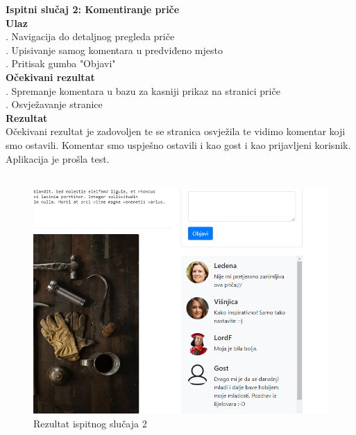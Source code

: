 {			\noindent \textbf{Ispitni slučaj 2: Komentiranje priče}
			\\
			\textbf{Ulaz}
			\\
			. Navigacija do detaljnog pregleda priče \\
			. Upisivanje samog komentara u predviđeno mjesto \\
			. Pritisak gumba "Objavi"
			\\
			\textbf{Očekivani rezultat}
			\\
			. Spremanje komentara u bazu za kasniji prikaz na stranici priče \\
			. Osvježavanje stranice
			\\
			\textbf{Rezultat}
			\\
			\indent Očekivani rezultat je zadovoljen te se stranica osvježila te vidimo komentar koji smo ostavili. Komentar smo uspješno ostavili i kao gost i kao prijavljeni korisnik. Aplikacija je prošla test.
			\\ \\
			\begin{figure}[H]
				\centering
				\includegraphics[scale=0.34]{"slike/test2"}
				\caption{Rezultat ispitnog slučaja 2}
				\label{fig:rezultat-ispitnog-slucaja-2}
			\end{figure}
			
}
